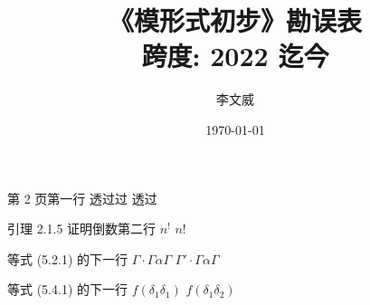 \documentclass{AJerrata}
\title{\bfseries 《模形式初步》勘误表 \\ 跨度: 2022 迄今}
\author{李文威}
\date{\today}
\begin{document}
	\maketitle
	
	\begin{Errata}
		\item[第 2 页第一行]
		\Orig 透过过
		\Corr 透过
		
		\item[引理 2.1.5 证明倒数第二行]
		\Orig $n^!$
		\Corr $n!$
		
		\item[等式 (5.2.1) 的下一行]
		\Orig $\Gamma \cdot \Gamma \alpha \Gamma$
		\Corr $\Gamma' \cdot \Gamma \alpha \Gamma$
		
		\item[等式 (5.4.1) 的下一行]
		\Orig $f(\delta_1 \delta_1)$
		\Corr $f(\delta_1 \delta_2)$
	\end{Errata}
\end{document}
